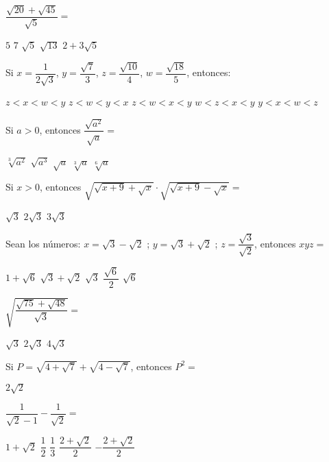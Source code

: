 \documentclass[]{srs}
\begin{document}
\begin{preguntas}[after-item-skip=3cm]

\pregunta \(\dfrac{\sqrt{20} + \sqrt{45}}{\sqrt{5}} =\)
\begin{vertical}
\alternativa \(5\)
\alternativa \(7\)
\alternativa \(\sqrt{5}\)
\alternativa \(\sqrt{13}\)
\alternativa \(2 + 3\sqrt{5}\)
\end{vertical}

\pregunta Si \(x = \dfrac{1}{2\sqrt{3}}\), \(y = \dfrac{\sqrt{7}}{3}\), \(z = \dfrac{\sqrt{10}}{4}\), \(w = \dfrac{\sqrt{18}}{5}\), entonces:
\begin{vertical}
\alternativa \(z<x<w<y\)
\alternativa \(z<w<y<x\)
\alternativa \(z<w<x<y\)
\alternativa \(w<z<x<y\)
\alternativa \(y<x<w<z\)
\end{vertical}

\pregunta Si \(a > 0\), entonces \(\dfrac{\sqrt{a^2}}{\sqrt{a}} =\)
\begin{vertical}
\alternativa \(\sqrt[3]{a^2}\)
\alternativa \(\sqrt{a^3}\)
\alternativa \(\sqrt{a}\)
\alternativa \(\sqrt[3]{a}\)
\alternativa \(\sqrt[6]{a}\)
\end{vertical}

\pregunta Si \(x > 0\), entonces \(\sqrt{\sqrt{x+9}+\sqrt{x}} \cdot \sqrt{\sqrt{x+9}-\sqrt{x}} =\)
\begin{vertical}
\alternativa \(\sqrt{3}\)
\alternativa \(2\sqrt{3}\)
\alternativa \(3\sqrt{3}\)
\end{vertical}

\pregunta Sean los números: \(x = \sqrt{3} - \sqrt{2}\) ; \(y = \sqrt{3} + \sqrt{2}\) ; \(z = \dfrac{\sqrt{3}}{\sqrt{2}}\), entonces \(xyz =\)
\begin{vertical}
\alternativa \(1 + \sqrt{6}\)
\alternativa \(\sqrt{3} + \sqrt{2}\)
\alternativa \(\sqrt{3}\)
\alternativa \(\dfrac{\sqrt{6}}{2}\)
\alternativa \(\sqrt{6}\)
\end{vertical}


\pregunta \(\sqrt{\dfrac{\sqrt{75} + \sqrt{48}}{\sqrt{3}}} =\)
\begin{vertical}
\alternativa \(\sqrt{3}\)
\alternativa \(2\sqrt{3}\)
\alternativa \(4\sqrt{3}\)
\end{vertical}

\pregunta Si \(P = \sqrt{4+\sqrt{7}} + \sqrt{4-\sqrt{7}}\), entonces \(P^2 =\)
\begin{vertical}
\alternativa \(2\sqrt{2}\)
\end{vertical}


\pregunta \(\dfrac{1}{\sqrt{2}-1} - \dfrac{1}{\sqrt{2}} =\)
\begin{vertical}
\alternativa \(1 + \sqrt{2}\)
\alternativa \(\dfrac{1}{2}\)
\alternativa \(\dfrac{1}{3}\)
\alternativa \(\dfrac{2 + \sqrt{2}}{2}\)
\alternativa \(-\dfrac{2 + \sqrt{2}}{2}\)
\end{vertical}

\end{preguntas}

\newpage
~
\end{document}

